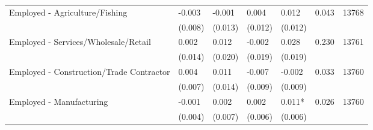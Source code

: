 \documentclass[6pt,landscape]{article}
\newcommand{\sym}[1]{#1} %
\begin{document}
\begin{tabular}{lllllll}
Employed - Agriculture/Fishing&      -0.003         &      -0.001         &       0.004         &       0.012         &       0.043         &   13768         \\
            &     (0.008)         &     (0.013)         &     (0.012)         &     (0.012)         &                     &                     \\
Employed - Services/Wholesale/Retail&       0.002         &       0.012         &      -0.002         &       0.028         &       0.230         &   13761         \\
            &     (0.014)         &     (0.020)         &     (0.019)         &     (0.019)         &                     &                     \\
Employed - Construction/Trade Contractor&       0.004         &       0.011         &      -0.007         &      -0.002         &       0.033         &   13760         \\
            &     (0.007)         &     (0.014)         &     (0.009)         &     (0.009)         &                     &                     \\
Employed - Manufacturing&      -0.001         &       0.002         &       0.002         &       0.011\sym{*}  &       0.026         &   13760         \\
            &     (0.004)         &     (0.007)         &     (0.006)         &     (0.006)         &                     &                     \\
\bottomrule
\end{tabular}
\end{document}
